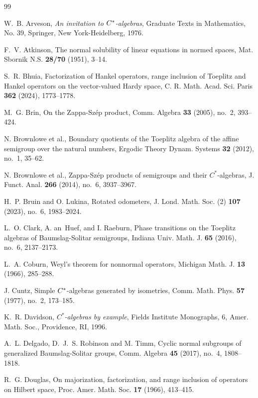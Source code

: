 \documentclass[12pt]{amsart}
\theoremstyle{definition}
\theoremstyle{remark}
\numberwithin{equation}{section}
\begin{document}
\begin{thebibliography}{99}

W.~B. Arveson, {\it An invitation to $C\sp*$-algebras}, Graduate Texts in Mathematics, No. 39, Springer, New York-Heidelberg, 1976.

F.~V. Atkinson, The normal solubility of linear equations in normed spaces, Mat. Sbornik N.S. {\bf 28/70} (1951), 3--14.

S.~R. Bhuia, Factorization of Hankel operators, range inclusion of Toeplitz and Hankel operators on the vector-valued Hardy space, C. R. Math. Acad. Sci. Paris {\bf 362} (2024), 1773--1778.



M.~G. Brin, On the Zappa-Sz\'ep product, Comm. Algebra {\bf 33} (2005), no.~2, 393--424.




N. Brownlowe et al., Boundary quotients of the Toeplitz algebra of the affine semigroup over the natural numbers, Ergodic Theory Dynam. Systems {\bf 32} (2012), no.~1, 35--62.

N. Brownlowe et al., Zappa-Sz\'ep products of semigroups and their $C^\ast$-algebras, J. Funct. Anal. {\bf 266} (2014), no.~6, 3937--3967.



H.~P. Bruin and O. Lukina, Rotated odometers, J. Lond. Math. Soc. (2) {\bf 107} (2023), no.~6, 1983--2024.


L.~O. Clark, A. an~Huef, and I. Raeburn, Phase transitions on the Toeplitz algebras of Baumslag-Solitar semigroups, Indiana Univ. Math. J. {\bf 65} (2016), no.~6, 2137--2173.

L.~A. Coburn, Weyl's theorem for nonnormal operators, Michigan Math. J. {\bf 13} (1966), 285--288.

J. Cuntz, Simple $C\sp*$-algebras generated by isometries, Comm. Math. Phys. {\bf 57} (1977), no.~2, 173--185.

K.~R. Davidson, {\it $C^*$-algebras by example}, Fields Institute Monographs, 6, Amer. Math. Soc., Providence, RI, 1996.

A.~L. Delgado, D.~J.~S. Robinson and M. Timm, Cyclic normal subgroups of generalized Baumslag-Solitar groups, Comm. Algebra {\bf 45} (2017), no.~4, 1808--1818.


R.~G. Douglas, On majorization, factorization, and range inclusion of operators on Hilbert space, Proc. Amer. Math. Soc. {\bf 17} (1966), 413--415.


\end{thebibliography}
\end{document}

